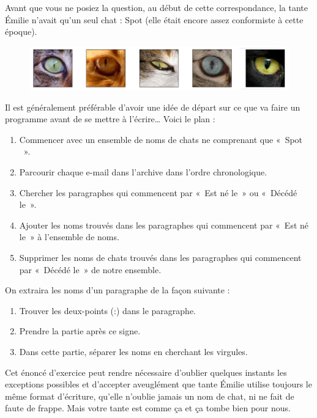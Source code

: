\documentclass{FramateX}
\begin{document}
Avant que vous ne posiez la question, au début de cette correspondance,
la tante Émilie n'avait qu'un seul chat : Spot (elle était encore assez
conformiste à cette époque).

\begin{center}\end{center}

\begin{figure}[ht!]
\centering
\includegraphics{img/eyes.png}
\caption{}
\end{figure}

\begin{center}\end{center}

Il est généralement préférable d'avoir une idée de départ sur ce que va
faire un programme avant de se mettre à l'écrire\ldots{} Voici le plan :

\begin{enumerate}
\item
  Commencer avec un ensemble de noms de chats ne comprenant que «~Spot
 ~».
\item
  Parcourir chaque e-mail dans l'archive dans l'ordre chronologique.
\item
  Chercher les paragraphes qui commencent par «~Est né le~» ou «~Décédé
  le~».
\item
  Ajouter les noms trouvés dans les paragraphes qui commencent par «~Est
  né le~» à l'ensemble de noms.
\item
  Supprimer les noms de chats trouvés dans les paragraphes qui
  commencent par «~Décédé le~» de notre ensemble.
\end{enumerate}
On extraira les noms d'un paragraphe de la façon suivante :

\begin{enumerate}
\item
  Trouver les deux-points (:) dans le paragraphe.
\item
  Prendre la partie après ce signe.
\item
  Dans cette partie, séparer les noms en cherchant les virgules.
\end{enumerate}
Cet énoncé d'exercice peut rendre nécessaire d'oublier quelques instants
les exceptions possibles et d'accepter aveuglément que tante Émilie
utilise toujours le même format d'écriture, qu'elle n'oublie jamais un
nom de chat, ni ne fait de faute de frappe. Mais votre tante est comme
ça et ça tombe bien pour nous.
\end{document}
